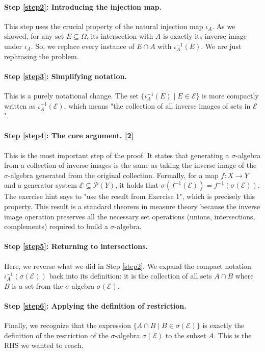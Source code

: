 \documentclass[11pt,a4paper]{article}
\begin{document}
\paragraph{Step \eqref{step2}: Introducing the injection map.}
This step uses the crucial property of the natural injection map $\iota_A$. As we showed, for any set $E \subseteq \Omega$, its intersection with $A$ is exactly its inverse image under $\iota_A$. So, we replace every instance of $E \cap A$ with $\iota_A^{-1}(E)$. We are just rephrasing the problem.

\paragraph{Step \eqref{step3}: Simplifying notation.}
This is a purely notational change. The set $\{\iota_A^{-1}(E) \mid E \in \mathcal{E}\}$ is more compactly written as $\iota_A^{-1}(\mathcal{E})$, which means "the collection of all inverse images of sets in $\mathcal{E}$".

\paragraph{Step \eqref{step4}: The core argument. \hyperref[exp2]{[2]}}
This is the most important step of the proof. It states that generating a $\sigma$-algebra from a collection of inverse images is the same as taking the inverse image of the $\sigma$-algebra generated from the original collection. Formally, for a map $f: X \to Y$ and a generator system $\mathcal{E} \subseteq \mathcal{P}(Y)$, it holds that $\sigma(f^{-1}(\mathcal{E})) = f^{-1}(\sigma(\mathcal{E}))$.
The exercise hint says to "use the result from Exercise 1", which is precisely this property. This result is a standard theorem in measure theory because the inverse image operation preserves all the necessary set operations (unions, intersections, complements) required to build a $\sigma$-algebra.

\paragraph{Step \eqref{step5}: Returning to intersections.}
Here, we reverse what we did in Step \eqref{step2}. We expand the compact notation $\iota_A^{-1}(\sigma(\mathcal{E}))$ back into its definition: it is the collection of all sets $A \cap B$ where $B$ is a set from the $\sigma$-algebra $\sigma(\mathcal{E})$.

\paragraph{Step \eqref{step6}: Applying the definition of restriction.}
Finally, we recognize that the expression $\{A \cap B \mid B \in \sigma(\mathcal{E})\}$ is exactly the definition of the restriction of the $\sigma$-algebra $\sigma(\mathcal{E})$ to the subset $A$. This is the RHS we wanted to reach.
\end{document}
